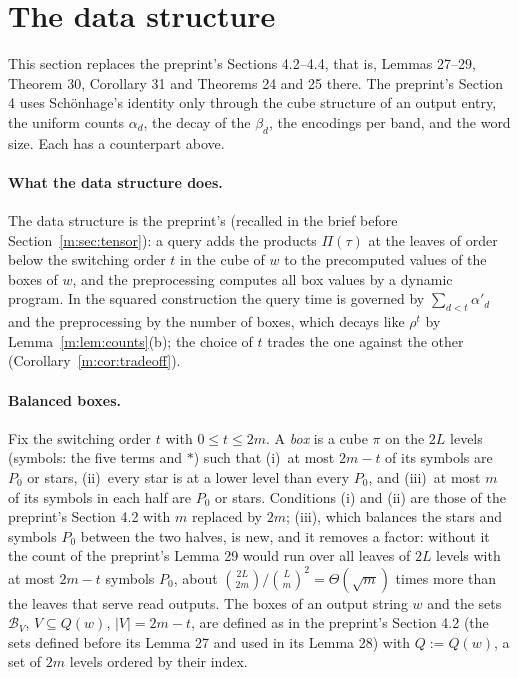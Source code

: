 \documentclass[11pt]{article}
\theoremstyle{definition}
\theoremstyle{remark}
\begin{document}
\section{The data structure}\label{m:sec:ds}

This section replaces the preprint's Sections 4.2--4.4, that is, Lemmas 27--29, Theorem 30, Corollary 31 and Theorems 24 and 25 there. The preprint's Section 4 uses Schönhage's identity only through the cube structure of an output entry, the uniform counts $\alpha_d$, the decay of the $\beta_d$, the encodings per band, and the word size. Each has a counterpart above.

\paragraph{What the data structure does.} The data structure is the preprint's (recalled in the brief before Section~\ref{m:sec:tensor}): a query adds the products $\Pi(\tau)$ at the leaves of order below the switching order $t$ in the cube of $w$ to the precomputed values of the boxes of $w$, and the preprocessing computes all box values by a dynamic program. In the squared construction the query time is governed by $\sum_{d<t}\alpha'_d$ and the preprocessing by the number of boxes, which decays like $\rho^t$ by Lemma~\ref{m:lem:counts}(b); the choice of $t$ trades the one against the other (Corollary~\ref{m:cor:tradeoff}).

\paragraph{Balanced boxes.} Fix the switching order $t$ with $0\le t\le2m$. A \emph{box} is a cube $\pi$ on the $2L$ levels (symbols: the five terms and $\ast$) such that (i)~at most $2m-t$ of its symbols are $P_0$ or stars, (ii)~every star is at a lower level than every $P_0$, and (iii)~at most $m$ of its symbols in each half are $P_0$ or stars. Conditions (i) and (ii) are those of the preprint's Section 4.2 with $m$ replaced by $2m$; (iii), which balances the stars and symbols $P_0$ between the two halves, is new, and it removes a factor: without it the count of the preprint's Lemma 29 would run over all leaves of $2L$ levels with at most $2m-t$ symbols $P_0$, about $\binom{2L}{2m}/\binom Lm^2=\Theta(\sqrt m)$ times more than the leaves that serve read outputs. The boxes of an output string $w$ and the sets $\mathcal B_V$, $V\subseteq Q(w)$, $|V|=2m-t$, are defined as in the preprint's Section 4.2 (the sets defined before its Lemma 27 and used in its Lemma 28) with $Q:=Q(w)$, a set of $2m$ levels ordered by their index.
\end{document}
